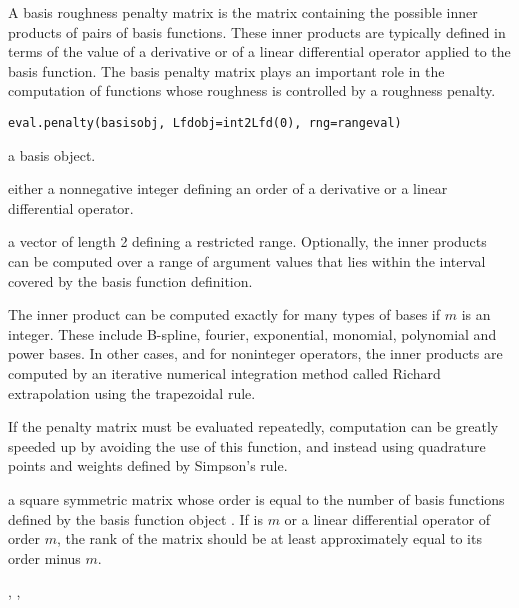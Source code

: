 \begin{Description}\relax
A basis roughness penalty matrix is the matrix containing
the possible inner products of pairs of basis functions.
These inner products are typically defined in terms of
the value of a derivative or of a linear differential
operator applied to the basis function.  The basis penalty
matrix plays an important role in the computation of
functions whose roughness is controlled by a roughness
penalty.
\end{Description}
\begin{Usage}
\begin{verbatim}
eval.penalty(basisobj, Lfdobj=int2Lfd(0), rng=rangeval)
\end{verbatim}
\end{Usage}
\begin{Arguments}
\begin{ldescription}
\item[\code{basisobj}] a basis object.
\item[\code{Lfdobj}] either a nonnegative integer defining an order of a
derivative or a linear differential operator.

\item[\code{rng}] a vector of length 2 defining a restricted range.
Optionally, the inner products can be computed over
a range of argument values that lies within the
interval covered by the basis function definition.

\end{ldescription}
\end{Arguments}
\begin{Details}\relax
The inner product can be computed exactly for many
types of bases if $m$ is an integer.  These include
B-spline, fourier, exponential, monomial, polynomial and power bases.
In other cases, and for noninteger operators, the
inner products are computed by an iterative numerical
integration method called Richard extrapolation using the
trapezoidal rule.

If the penalty matrix must be evaluated repeatedly,
computation can be greatly speeded up by avoiding the use
of this function, and instead using quadrature points and
weights defined by Simpson's rule.
\end{Details}
\begin{Value}
a square symmetric matrix whose order is equal
to the number of basis functions defined by
the basis function object .
If  is $m$ or a linear
differential operator of order $m$, the rank
of the matrix should be at least approximately equal to
its order minus  $m$.
\end{Value}
\begin{SeeAlso}\relax
{}, 
,
\end{SeeAlso}

